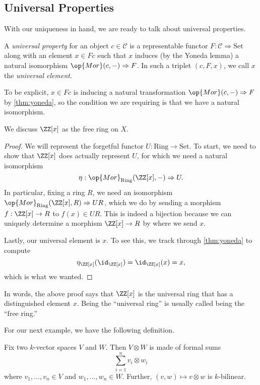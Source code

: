 \subsection{Universal Properties}
With our uniqueness in hand, we are ready to talk about universal properties.
\begin{definition}
	A \textit{universal property} for an object $c\in\mathcal C$ is a representable functor $F:\mathcal C\Rightarrow\mathrm{Set}$ along with an element $x\in Fc$ such that $x$ induces (by the Yoneda lemma) a natural isomorphism $\op{Mor}(c,-)\Rightarrow F$. In such a triplet $(c,F,x)$, we call $x$ the \textit{universal element}.
\end{definition}
To be explicit, $x\in Fc$ is inducing a natural transformation $\op{Mor}(c,-)\Rightarrow F$ by \autoref{thm:yoneda}, so the condition we are requiring is that we have a natural isomorphism.
\begin{exe}
	We discuss $\ZZ[x]$ as the free ring on $X$.
\end{exe}
\begin{proof}
	We will represent the forgetful functor $U:\mathrm{Ring}\to\mathrm{Set}$. To start, we need to show that $\ZZ[x]$ does actually represent $U$, for which we need a natural isomorphism
	\[\eta:\op{Mor}_{\mathrm{Ring}}(\ZZ[x],-)\Rightarrow U.\]
	In particular, fixing a ring $R$, we need an isomorphism $\op{Mor}_{\mathrm{Ring}}(\ZZ[x],R)\Rightarrow UR$, which we do by sending a morphism $f:\ZZ[x]\to R$ to $f(x)\in UR$. This is indeed a bijection because we can uniquely determine a morphism $\ZZ[x]\to R$ by where we send $x$.
	
	Lastly, our universal element is $x$. To see this, we track through \autoref{thm:yoneda} to compute
	\[\eta_{\ZZ[x]}(\id_{\ZZ[x]})=\id_{\ZZ[x]}(x)=x,\]
	which is what we wanted.
\end{proof}
\begin{remark}
	In words, the above proof says that $\ZZ[x]$ is the universal ring that has a distinguished element $x$. Being the ``universal ring'' is usually called being the ``free ring.''
\end{remark}
For our next example, we have the following definition.
\begin{definition}
	Fix two $k$-vector spaces $V$ and $W$. Then $V\otimes W$ is made of formal sums
	\[\sum_{i=1}^nv_i\otimes w_i\]
	where $v_1,\ldots,v_n\in V$ and $w_1,\ldots,w_n\in W$. Further, $(v,w)\mapsto v\otimes w$ is $k$-bilinear.
\end{definition}
